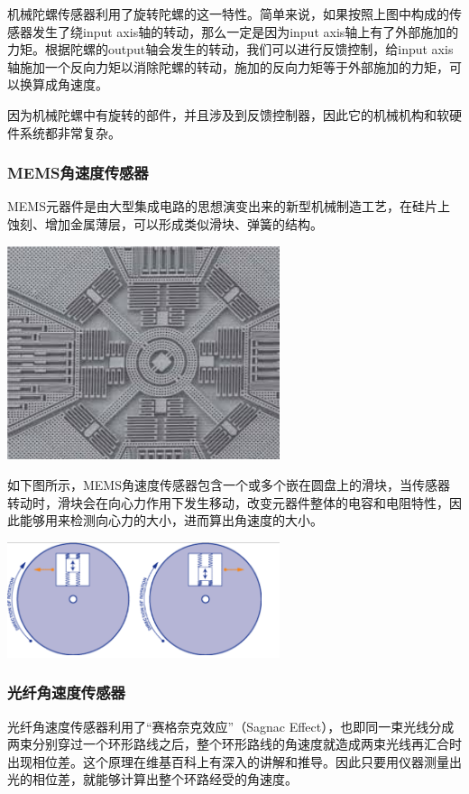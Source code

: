\documentclass[11pt]{article}
\begin{document}
机械陀螺传感器利用了旋转陀螺的这一特性。简单来说，如果按照上图中构成的传感器发生了绕input axis轴的转动，那么一定是因为input axis轴上有了外部施加的力矩。根据陀螺的output轴会发生的转动，我们可以进行反馈控制，给input axis轴施加一个反向力矩以消除陀螺的转动，施加的反向力矩等于外部施加的力矩，可以换算成角速度。

因为机械陀螺中有旋转的部件，并且涉及到反馈控制器，因此它的机械机构和软硬件系统都非常复杂。
\subsubsection{MEMS角速度传感器}
MEMS元器件是由大型集成电路的思想演变出来的新型机械制造工艺，在硅片上蚀刻、增加金属薄层，可以形成类似滑块、弹簧的结构。

\begin{center}
\includegraphics[width=0.6\textwidth]{images/memsgyro0.jpg}
\end{center}

如下图所示，MEMS角速度传感器包含一个或多个嵌在圆盘上的滑块，当传感器转动时，滑块会在向心力作用下发生移动，改变元器件整体的电容和电阻特性，因此能够用来检测向心力的大小，进而算出角速度的大小。

\begin{center}
\includegraphics[width=0.6\textwidth]{images/memsgyro.png}
\end{center}
\subsubsection{光纤角速度传感器}
光纤角速度传感器利用了“赛格奈克效应”（Sagnac Effect），也即同一束光线分成两束分别穿过一个环形路线之后，整个环形路线的角速度就造成两束光线再汇合时出现相位差。这个原理在维基百科上有深入的讲解和推导。因此只要用仪器测量出光的相位差，就能够计算出整个环路经受的角速度。
\end{document}
